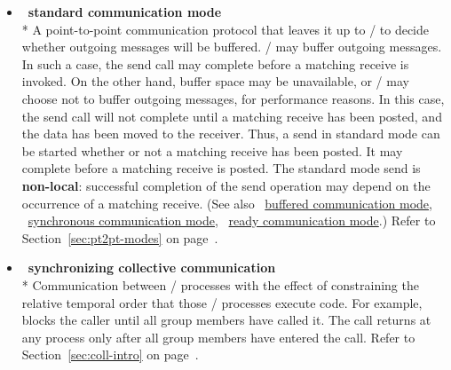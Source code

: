 \begin{itemize}
\label{glossary:standard_communication_mode}
\item  ~\hypertarget{glossary:standard_communication_mode}{\textbf{standard communication mode}} \\*
A point-to-point communication protocol that leaves it up to \MPI/ to decide whether outgoing
messages will be buffered.  \MPI/ may
buffer outgoing messages.  In such a case, the send call may complete
before a matching receive is invoked.  On the other hand, buffer space may be
unavailable, or \MPI/ may choose not to buffer
outgoing messages, for performance reasons. In this case,
the send call will not complete until a matching receive has been posted, and
the data has been moved to the receiver.
Thus, a send in standard mode can be started whether or not a
matching receive has been posted.  It may complete before a matching receive
is posted.  The
standard mode send is {\bf non-local}:  successful completion of the send
operation may depend on the occurrence of a matching receive. 
(See also ~\hyperlink{glossary:buffered_communication_mode}{buffered communication mode}, 
~\hyperlink{glossary:synchronous_communication_mode}{synchronous communication mode},
~\hyperlink{glossary:ready_communication_mode}{ready communication mode}.)
Refer to Section~\ref{sec:pt2pt-modes} on page~\pageref{sec:pt2pt-modes}.

\label{glossary:synchronizing_collective_communication}
\item  ~\hypertarget{glossary:synchronizing_collective_communication}{\textbf{synchronizing collective communication}} \\*
Communication between \MPI/ processes with the effect of constraining the relative temporal
order that those \MPI/  processes execute code. For example,  
blocks the caller until all group members have called it. The call returns at any process 
only after all group members have
entered the call.
Refer to Section~\ref{sec:coll-intro} on page~\pageref{sec:coll-intro}.


\end{itemize}
